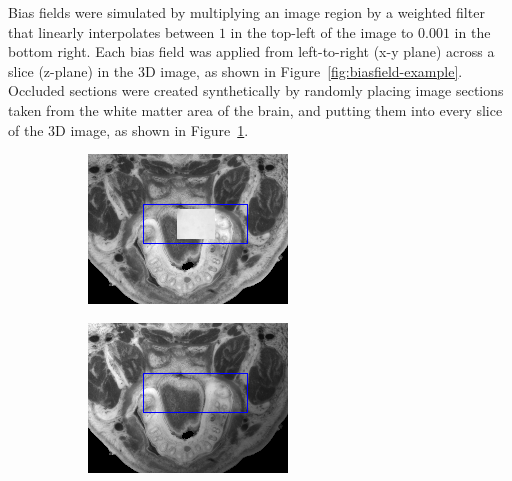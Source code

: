 Bias fields were simulated by multiplying an image region by a weighted filter that linearly interpolates between $1$ in the top-left of the image to $0.001$ in the bottom right. Each bias field was applied from left-to-right (x-y plane) across a slice (z-plane) in the 3D image, as shown in Figure~\ref{fig:biasfield-example}. Occluded sections were created synthetically by randomly placing image sections taken from the white matter area of the brain, and putting them into every slice of the 3D image, as shown in Figure~\ref{fig:occlusion-example}.
\begin{figure}[b]
        \centering
        \begin{subfigure}{0.22\textwidth}
                \centering
                \includegraphics[width=\textwidth]{images/occluded-example}
                \subcaption{}
                \label{fig:occlusion-example}
        \end{subfigure}
        \begin{subfigure}{0.22\textwidth}
                \centering
                \includegraphics[width=\textwidth]{images/biasfield-example}

\end{subfigure}
\end{figure}
